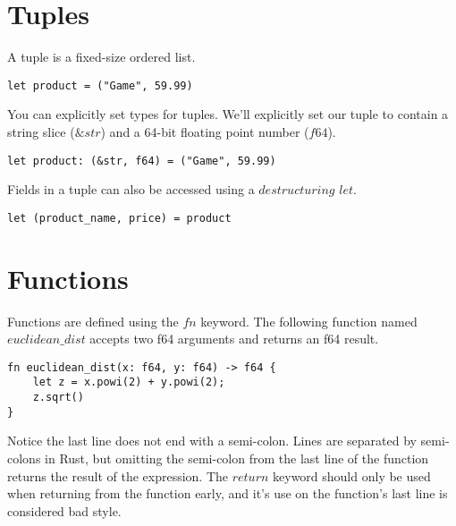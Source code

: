 \documentclass[letterpaper,landscape]{article}
\begin{document}
\begin{multicols}{3}
\section*{Tuples}

A tuple is a fixed-size ordered list.

\begin{verbatim}
let product = ("Game", 59.99)
\end{verbatim}

You can explicitly set types for tuples. We'll explicitly set our tuple to contain a string slice ($\&str$) and a 64-bit floating point number ($f64$).

\begin{verbatim}
let product: (&str, f64) = ("Game", 59.99)
\end{verbatim}

Fields in a tuple can also be accessed using a $destructuring$ $let$.

\begin{verbatim}
let (product_name, price) = product
\end{verbatim}

\section*{Functions}

Functions are defined using the $fn$ keyword. The following function named $euclidean\_dist$ accepts two f64 arguments and returns an f64 result.

\begin{verbatim}
fn euclidean_dist(x: f64, y: f64) -> f64 {
    let z = x.powi(2) + y.powi(2);
    z.sqrt()
}
\end{verbatim}

Notice the last line does not end with a semi-colon. Lines are separated by semi-colons in Rust, but omitting the semi-colon from the last line of the function returns the result of the expression. The $return$ keyword should only be used when returning from the function early, and it's use on the function's last line is considered bad style.


\end{multicols}
\end{document}
